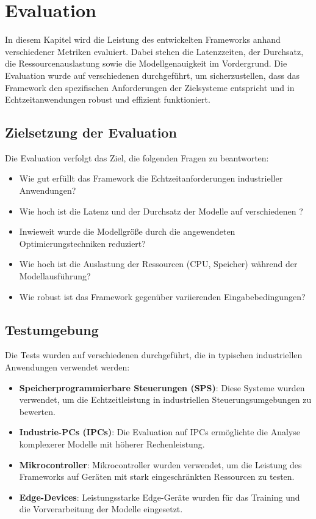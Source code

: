 \chapter{Evaluation}
\label{chap:evaluation}

In diesem Kapitel wird die Leistung des entwickelten Frameworks anhand verschiedener Metriken evaluiert. Dabei stehen die Latenzzeiten, 
der Durchsatz, die Ressourcenauslastung sowie die Modellgenauigkeit im Vordergrund. Die Evaluation wurde auf verschiedenen \Emb durchgeführt, 
um sicherzustellen, dass das Framework den spezifischen Anforderungen der Zielsysteme entspricht und in Echtzeitanwendungen robust und effizient funktioniert.

\section{Zielsetzung der Evaluation}
Die Evaluation verfolgt das Ziel, die folgenden Fragen zu beantworten:
\begin{itemize}
    \item Wie gut erfüllt das Framework die Echtzeitanforderungen industrieller Anwendungen?
    \item Wie hoch ist die Latenz und der Durchsatz der Modelle auf verschiedenen \Emb?
    \item Inwieweit wurde die Modellgröße durch die angewendeten Optimierungstechniken reduziert?
    \item Wie hoch ist die Auslastung der Ressourcen (CPU, Speicher) während der Modellausführung?
    \item Wie robust ist das Framework gegenüber variierenden Eingabebedingungen?
\end{itemize}

\section{Testumgebung}
Die Tests wurden auf verschiedenen \Emb durchgeführt, die in typischen industriellen Anwendungen verwendet werden:
\begin{itemize}
    \item \textbf{Speicherprogrammierbare Steuerungen (SPS)}: Diese Systeme wurden verwendet, um die Echtzeitleistung in industriellen 
    Steuerungsumgebungen zu bewerten.
    \item \textbf{Industrie-PCs (IPCs)}: Die Evaluation auf IPCs ermöglichte die Analyse komplexerer Modelle mit höherer Rechenleistung.
    \item \textbf{Mikrocontroller}: Mikrocontroller wurden verwendet, um die Leistung des Frameworks auf Geräten mit stark eingeschränkten 
    Ressourcen zu testen.
    \item \textbf{Edge-Devices}: Leistungsstarke Edge-Geräte wurden für das Training und die Vorverarbeitung der Modelle eingesetzt.
\end{itemize}

